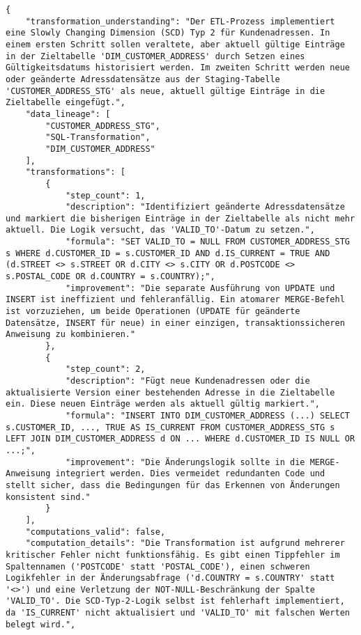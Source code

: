 \begin{lstlisting}[caption={Ausgabe: GEMINI 2.5 Pro Anwendungsfall 9 Robustheitsdurchlauf},label={gemini_case9_prompt3}]
{
    "transformation_understanding": "Der ETL-Prozess implementiert eine Slowly Changing Dimension (SCD) Typ 2 für Kundenadressen. In einem ersten Schritt sollen veraltete, aber aktuell gültige Einträge in der Zieltabelle 'DIM_CUSTOMER_ADDRESS' durch Setzen eines Gültigkeitsdatums historisiert werden. Im zweiten Schritt werden neue oder geänderte Adressdatensätze aus der Staging-Tabelle 'CUSTOMER_ADDRESS_STG' als neue, aktuell gültige Einträge in die Zieltabelle eingefügt.",
    "data_lineage": [
        "CUSTOMER_ADDRESS_STG",
        "SQL-Transformation",
        "DIM_CUSTOMER_ADDRESS"
    ],
    "transformations": [
        {
            "step_count": 1,
            "description": "Identifiziert geänderte Adressdatensätze und markiert die bisherigen Einträge in der Zieltabelle als nicht mehr aktuell. Die Logik versucht, das 'VALID_TO'-Datum zu setzen.",
            "formula": "SET VALID_TO = NULL FROM CUSTOMER_ADDRESS_STG s WHERE d.CUSTOMER_ID = s.CUSTOMER_ID AND d.IS_CURRENT = TRUE AND (d.STREET <> s.STREET OR d.CITY <> s.CITY OR d.POSTCODE <> s.POSTAL_CODE OR d.COUNTRY = s.COUNTRY);",
            "improvement": "Die separate Ausführung von UPDATE und INSERT ist ineffizient und fehleranfällig. Ein atomarer MERGE-Befehl ist vorzuziehen, um beide Operationen (UPDATE für geänderte Datensätze, INSERT für neue) in einer einzigen, transaktionssicheren Anweisung zu kombinieren."
        },
        {
            "step_count": 2,
            "description": "Fügt neue Kundenadressen oder die aktualisierte Version einer bestehenden Adresse in die Zieltabelle ein. Diese neuen Einträge werden als aktuell gültig markiert.",
            "formula": "INSERT INTO DIM_CUSTOMER_ADDRESS (...) SELECT s.CUSTOMER_ID, ..., TRUE AS IS_CURRENT FROM CUSTOMER_ADDRESS_STG s LEFT JOIN DIM_CUSTOMER_ADDRESS d ON ... WHERE d.CUSTOMER_ID IS NULL OR ...;",
            "improvement": "Die Änderungslogik sollte in die MERGE-Anweisung integriert werden. Dies vermeidet redundanten Code und stellt sicher, dass die Bedingungen für das Erkennen von Änderungen konsistent sind."
        }
    ],
    "computations_valid": false,
    "computation_details": "Die Transformation ist aufgrund mehrerer kritischer Fehler nicht funktionsfähig. Es gibt einen Tippfehler im Spaltennamen ('POSTCODE' statt 'POSTAL_CODE'), einen schweren Logikfehler in der Änderungsabfrage ('d.COUNTRY = s.COUNTRY' statt '<>') und eine Verletzung der NOT-NULL-Beschränkung der Spalte 'VALID_TO'. Die SCD-Typ-2-Logik selbst ist fehlerhaft implementiert, da 'IS_CURRENT' nicht aktualisiert und 'VALID_TO' mit falschen Werten belegt wird.",

\end{lstlisting}
